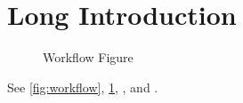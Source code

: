 \section[Short Intro]{Long Introduction}\label{sec:intro}
\begin{figure}\caption[Workflow Short]{Workflow Figure}\label{fig:workflow}\end{figure}
See \autoref{fig:workflow}, \cref{fig:workflow}, , and .
